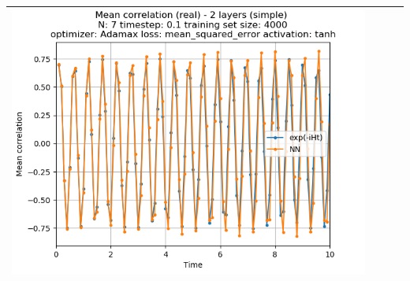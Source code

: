 \documentclass{article}
\begin{document}
\begin{tabular}{|c|c|c|c|}
     \includegraphics[scale=0.37]{./1,2,3x_longer_than_t_total/2_layers_simple_train_samples=4000_timestep=0.1_t_total=1x_optimizer=Adamax_loss=mean_squared_error_activation=tanh/Corr_N=7_(real).png} \\ \hline


\end{tabular}
\end{document}
